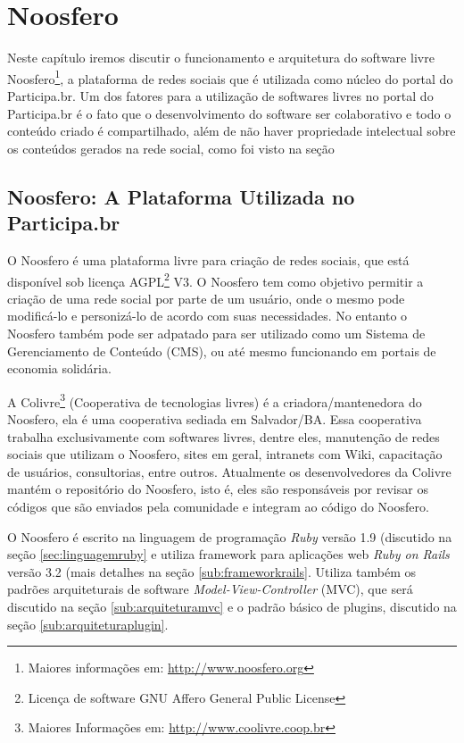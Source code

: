 \chapter{Noosfero}

Neste capítulo iremos discutir o funcionamento e arquitetura do software livre Noosfero\footnote{Maiores informações em: \url{http://www.noosfero.org}}, a plataforma de redes sociais que é utilizada como núcleo do portal do Participa.br. Um dos fatores para a utilização de softwares livres no portal do Participa.br é o fato que o desenvolvimento do software ser colaborativo e todo o conteúdo criado é compartilhado, além de não haver propriedade intelectual sobre os conteúdos gerados na rede social, como foi visto na seção %

\section{Noosfero: A Plataforma Utilizada no Participa.br}
O Noosfero é uma plataforma livre para criação de redes sociais, que está disponível sob licença AGPL\footnote{Licença de software GNU Affero General Public License} V3. O Noosfero tem como objetivo permitir a criação de uma rede social por parte de um usuário, onde o mesmo pode modificá-lo e personizá-lo de acordo com suas necessidades. No entanto o Noosfero também pode ser adpatado para ser utilizado como um Sistema de Gerenciamento de Conteúdo (CMS), ou até mesmo funcionando em portais de economia solidária.

A Colivre\footnote{Maiores Informações em: \url{http://www.coolivre.coop.br}} (Cooperativa de tecnologias livres) é a criadora/mantenedora do Noosfero, ela é uma cooperativa sediada em Salvador/BA. Essa cooperativa trabalha exclusivamente com softwares livres, dentre eles, manutenção de redes sociais que utilizam o Noosfero, sites em geral, intranets com Wiki, capacitação de usuários, consultorias, entre outros. Atualmente os desenvolvedores da Colivre mantém o repositório do Noosfero, isto é, eles são responsáveis por revisar os códigos que são enviados pela comunidade e integram ao código do Noosfero.

O Noosfero é escrito na linguagem de programação \textit{Ruby} versão 1.9 (discutido na seção \ref{sec:linguagemruby} e utiliza framework para aplicações web \textit{Ruby on Rails} versão 3.2 (mais detalhes na seção \ref{sub:frameworkrails}. Utiliza também os padrões arquiteturais de software \textit{Model-View-Controller} (MVC), que será discutido na seção \ref{sub:arquiteturamvc} e o padrão básico de plugins, discutido na seção \ref{sub:arquiteturaplugin}. 

